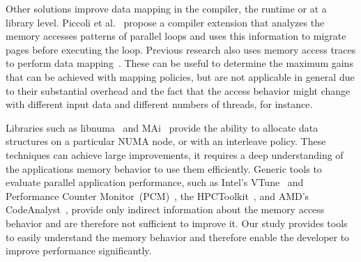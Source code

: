 

Other solutions improve data mapping in the compiler, the runtime or at a library level.
Piccoli et al.~\cite{Piccoli2014} propose a compiler extension that analyzes
the memory accesses patterns of parallel loops and uses this information to migrate
pages before executing the loop.
Previous research also uses memory access traces to perform data mapping~\cite{Marathe2010,Bolosky1992}. These can be useful to determine the maximum gains that can be achieved with mapping policies, but are not applicable in general due to their substantial overhead and the fact that the access behavior might change with different input data and different numbers of threads, for instance.


Libraries such as libnuma~\cite{Kleen2004} and MAi~\cite{Ribeiro2009} provide
the ability to allocate data structures on a particular NUMA node, or with an
interleave policy. These techniques can achieve large improvements, it
requires a deep understanding of the applications memory behavior to use them
efficiently.
Generic tools to evaluate parallel application performance, such as Intel's
VTune~\cite{Reinders05VTune} and Performance Counter
Monitor~(PCM)~\cite{Intel2012b}, the HPCToolkit~\cite{Adhianto10HPCTOOLKIT},
and AMD's CodeAnalyst~\cite{Drongowski2008}, provide only indirect information
about the memory access behavior and are therefore not sufficient to improve it.
Our study provides tools to easily understand the memory behavior
and therefore enable the developer to improve performance significantly.

%

